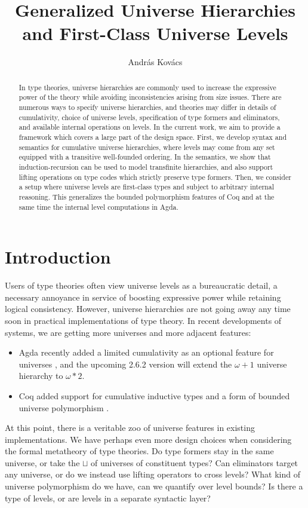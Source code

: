 \documentclass[a4paper,UKenglish,cleveref, autoref, thm-restate]{lipics-v2021}
\title{Generalized Universe Hierarchies and First-Class Universe Levels}
\author{András Kovács}{Eötvös Loránd University, Hungary}{kovacsandras@inf.elte.hu}{https://orcid.org/0000-0002-6375-9781}{}
\theoremstyle{remark}
\theoremstyle{definition}
\begin{document}
\maketitle

\begin{abstract}
In type theories, universe hierarchies are commonly used to increase the
expressive power of the theory while avoiding inconsistencies arising from size
issues. There are numerous ways to specify universe hierarchies, and theories
may differ in details of cumulativity, choice of universe levels, specification
of type formers and eliminators, and available internal operations on levels. In
the current work, we aim to provide a framework which covers a large part of the
design space. First, we develop syntax and semantics for cumulative universe
hierarchies, where levels may come from any set equipped with a transitive
well-founded ordering. In the semantics, we show that induction-recursion can be
used to model transfinite hierarchies, and also support lifting operations on
type codes which strictly preserve type formers. Then, we consider a setup where
universe levels are first-class types and subject to arbitrary internal
reasoning. This generalizes the bounded polymorphism features of Coq and at the
same time the internal level computations in Agda.
\end{abstract}

\section{Introduction}
\label{sec:introduction}

Users of type theories often view universe levels as a bureaucratic detail, a
necessary annoyance in service of boosting expressive power while retaining
logical consistency. However, universe hierarchies are not going away any time
soon in practical implementations of type theory. In recent developments of
systems, we are getting more universes and more adjacent features:
\begin{itemize}
\item Agda recently added a limited cumulativity as an optional feature
  for universes \cite{agdadocs}, and the upcoming 2.6.2 version will extend the $\omega+1$
  universe hierarchy to $\omega*2$.
\item Coq added support for cumulative inductive types \cite{timany18cumulative}
  and a form of bounded universe polymorphism \cite{ziliani15unification}.
\end{itemize}
\noindent At this point, there is a veritable zoo of universe features in existing
implementations. We have perhaps even more design choices when considering the
formal metatheory of type theories. Do type formers stay in the same
universe, or take the $\sqcup$ of universes of constituent types? Can
eliminators target any universe, or do we instead use lifting operators to cross
levels? What kind of universe polymorphism do we have, can we quantify over
level bounds? Is there a type of levels, or are levels in a separate syntactic layer?
\end{document}
